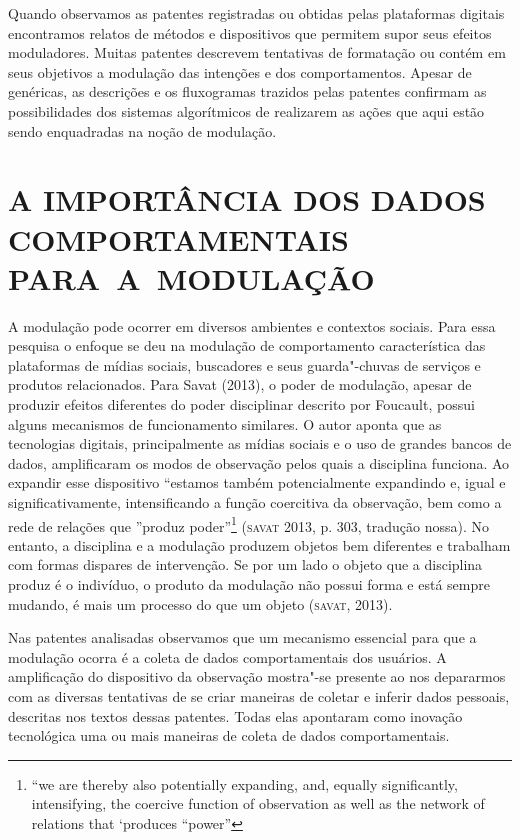 Quando observamos as patentes registradas ou obtidas pelas plataformas
digitais encontramos relatos de métodos e dispositivos que permitem
supor seus efeitos moduladores. Muitas patentes descrevem tentativas de
formatação ou contém em seus objetivos a modulação das intenções e dos
comportamentos. Apesar de genéricas, as descrições e os fluxogramas
trazidos pelas patentes confirmam as possibilidades dos sistemas
algorítmicos de realizarem as ações que aqui estão sendo enquadradas na
noção de modulação.

\section{A IMPORTÂNCIA DOS DADOS COMPORTAMENTAIS PARA~A~MODULAÇÃO}

A modulação pode ocorrer em diversos ambientes e contextos sociais. Para
essa pesquisa o enfoque se deu na modulação de comportamento
característica das plataformas de mídias sociais, buscadores e seus
guarda"-chuvas de serviços e produtos relacionados. Para Savat (2013), o
poder de modulação, apesar de produzir efeitos diferentes do poder
disciplinar descrito por Foucault, possui alguns mecanismos de
funcionamento similares. O autor aponta que as tecnologias digitais,
principalmente as mídias sociais e o uso de grandes bancos de dados,
amplificaram os modos de observação pelos quais a disciplina funciona.
Ao expandir esse dispositivo ``estamos também potencialmente expandindo
e, igual e significativamente, intensificando a função coercitiva da
observação, bem como a rede de relações que ''produz poder''\footnote{``we
  are thereby also potentially expanding, and, equally significantly,
  intensifying, the coercive function of observation as well as the
  network of relations that `produces ``power''} (\textsc{savat} 2013, p. 303,
tradução nossa). No entanto, a disciplina e a modulação produzem objetos
bem diferentes e trabalham com formas dispares de intervenção. Se por um
lado o objeto que a disciplina produz é o indivíduo, o produto da
modulação não possui forma e está sempre mudando, é mais um processo do
que um objeto (\textsc{savat}, 2013).

Nas patentes analisadas observamos que um mecanismo essencial para que a
modulação ocorra é a coleta de dados comportamentais dos usuários. A
amplificação do dispositivo da observação mostra"-se presente ao nos
depararmos com as diversas tentativas de se criar maneiras de coletar e
inferir dados pessoais, descritas nos textos dessas patentes. Todas elas
apontaram como inovação tecnológica uma ou mais maneiras de coleta de
dados comportamentais.

